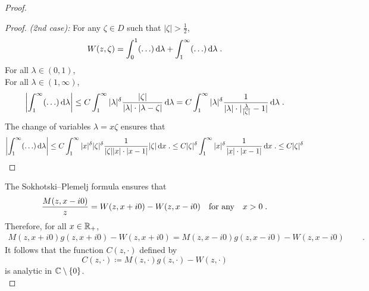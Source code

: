 \documentclass[11pt]{amsart}
\newcommand{\diff}{\,\mathrm{d}}
\begin{document}
\begin{proof}
\begin{proof}
\textit{(2nd case):} For any $\zeta \in D$ such that $|\zeta| > \frac{1}{2}$, 
\begin{align*}
    W(z, \zeta) = \int_0^{1} (\ldots)\diff \lambda + \int_1^\infty (\ldots) \diff \lambda \eqfinp
\end{align*} 
For all $\lambda \in (0,1)$, \\
For all $\lambda \in (1, \infty)$, 
   $$\left| \int_1^\infty (\ldots) \diff \lambda \right|
   \leq C \int_1^\infty |\lambda|^\delta \frac{|\zeta|} {|\lambda|\cdot|\lambda-\zeta|} \diff \lambda  
   = C \int_1^\infty |\lambda|^\delta \frac{1} {|\lambda|\cdot|\frac{\lambda}{|\zeta|}-1|} \diff \lambda \eqfinp$$
The change of variables $\lambda = x \zeta$ ensures that 
    $$ 
    \left| \int_1^\infty (\ldots) \diff \lambda \right|
    \leq 
    C \int_1^\infty |x|^\delta |\zeta|^\delta \frac{1} {|\zeta||x|\cdot|x-1|} |\zeta|\diff x \eqfinp
    \leq 
    C |\zeta|^\delta \int_1^\infty |x|^\delta \frac{1}{|x|\cdot|x-1|}\diff x \eqfinp
    \leq C |\zeta|^\delta
    $$
\end{proof}

The Sokhotski--Plemelj formula ensures that 
\begin{align*}
    \frac{M(z,x-i0)}{z}
    = 
    W(z,x+i0) - W(z,x-i0)
    \quad \text{for any} \quad
    x > 0
    \; .
\end{align*}
Therefore, for all $x\in\mathbb{R}_+$, 
\begin{align*}
    M(z,x+i0)g(z, x+i0) -W(z,x+i0) = M(z,x-i0)g(z, x-i0) - W(z,x-i0) \, \qquad \text{}.
\end{align*}
It follows that the function $C(z,\cdot)$ defined by 
$$ C(z,\cdot) \coloneqq M(z,\cdot)g(z,\cdot) - W(z,\cdot)$$
is analytic in $\mathbb{C} \setminus \{0\}$.\\



\end{proof}
\end{document}
